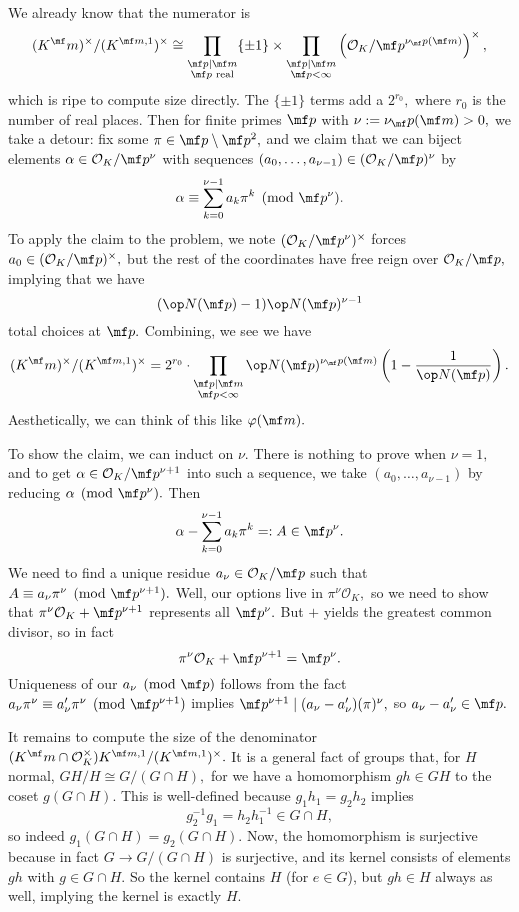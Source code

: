 We already know that the numerator is
\[(K^\mf m)^\times/(K^{\mf m,1})^\times\cong\prod_{\substack{\mf p\mid\mf m\\\mf p\text{ real}}}\{\pm1\}\times\prod_{\substack{\mf p\mid\mf m\\\mf p<\infty}}\left(\mathcal O_K/\mf p^{\nu_\mf p(\mf m)}\right)^\times,\]
which is ripe to compute size directly. The $\{\pm1\}$ terms add a $2^{r_0},$ where $r_0$ is the number of real places. Then for finite primes $\mf p$ with $\nu:=\nu_\mf p(\mf m)>0,$ we take a detour: fix some $\pi\in\mf p\setminus\mf p^2,$ and we claim that we can biject elements $\alpha\in\mathcal O_K/\mf p^\nu$ with sequences $(a_0,\ldots,a_{\nu-1})\in(\mathcal O_K/\mf p)^\nu$ by
\[\alpha\equiv\sum_{k=0}^{\nu-1}a_k\pi^k\pmod{\mf p^\nu}.\]
To apply the claim to the problem, we note $(\mathcal O_K/\mf p^\nu)^\times$ forces $a_0\in(\mathcal O_K/\mf p)^\times,$ but the rest of the coordinates have free reign over $\mathcal O_K/\mf p,$ implying that we have
\[(\op N(\mf p)-1)\op N(\mf p)^{\nu-1}\]
total choices at $\mf p.$ Combining, we see we have
\[(K^\mf m)^\times/(K^{\mf m,1})^\times=2^{r_0}\cdot\prod_{\substack{\mf p\mid\mf m\\\mf p<\infty}}\op N(\mf p)^{\nu_\mf p(\mf m)}\left(1-\frac1{\op N(\mf p)}\right).\]
Aesthetically, we can think of this like $\varphi(\mf m).$

To show the claim, we can induct on $\nu.$ There is nothing to prove when $\nu=1,$ and to get $\alpha\in\mathcal O_K/\mf p^{\nu+1}$ into such a sequence, we take $(a_0,\ldots,a_{\nu-1})$ by reducing $\alpha\pmod{\mf p^\nu}.$ Then
\[\alpha-\sum_{k=0}^{\nu-1}a_k\pi^k=:A\in\mf p^\nu.\]
We need to find a unique residue $a_\nu\in\mathcal O_K/\mf p$ such that $A\equiv a_\nu\pi^\nu\pmod{\mf p^{\nu+1}}.$ Well, our options live in $\pi^\nu\mathcal O_K,$ so we need to show that $\pi^\nu\mathcal O_K+\mf p^{\nu+1}$ represents all $\mf p^\nu.$ But $+$ yields the greatest common divisor, so in fact
\[\pi^\nu\mathcal O_K+\mf p^{\nu+1}=\mf p^\nu.\]
Uniqueness of our $a_\nu\pmod{\mf p}$ follows from the fact $a_\nu\pi^\nu\equiv a'_\nu\pi^\nu\pmod{\mf p^{\nu+1}}$ implies $\mf p^{\nu+1}\mid(a_\nu-a_\nu')(\pi)^\nu,$ so $a_\nu-a_\nu'\in\mf p.$

It remains to compute the size of the denominator $(K^\mf m\cap\mathcal O_K^\times)K^{\mf m,1}/(K^{\mf m,1})^\times.$ It is a general fact of groups that, for $H$ normal, $GH/H\cong G/(G\cap H),$ for we have a homomorphism $gh\in GH$ to the coset $g(G\cap H).$ This is well-defined because $g_1h_1=g_2h_2$ implies
\[g_2^{-1}g_1=h_2h_1^{-1}\in G\cap H,\]
so indeed $g_1(G\cap H)=g_2(G\cap H).$ Now, the homomorphism is surjective because in fact $G\to G/(G\cap H)$ is surjective, and its kernel consists of elements $gh$ with $g\in G\cap H.$ So the kernel contains $H$ (for $e\in G$), but $gh\in H$ always as well, implying the kernel is exactly $H.$

